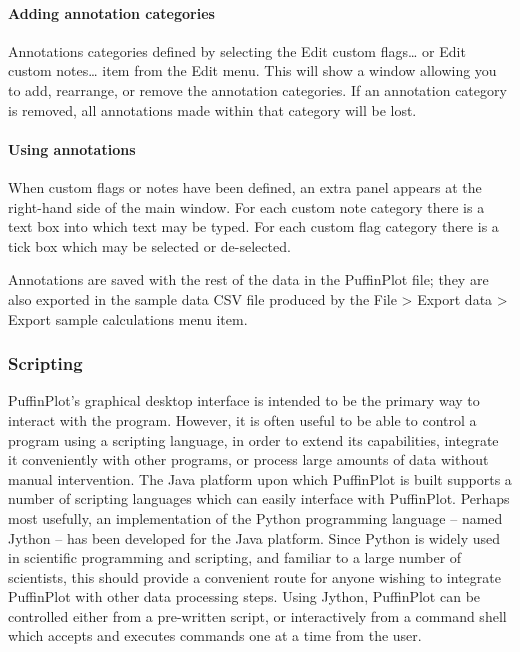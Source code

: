 \documentclass[a4paper,british]{article}
\newcommand{\ppcmd}[1]{\textsf{#1}} %
\newcommand{\caps}[1]{\MakeTextUppercase{#1}} %
\newcommand{\submenu}{ \textgreater{} } %
\begin{document}
\paragraph{Adding annotation categories}

Annotations categories defined by selecting the \ppcmd{Edit custom
  flags\ldots} or \ppcmd{Edit custom notes\ldots} item from the \ppcmd{Edit}
menu. This will show a window allowing you to add, rearrange, or remove the
annotation categories. If an annotation category is removed, all annotations
made within that category will be lost.

\paragraph{Using annotations}

When custom flags or notes have been defined, an extra panel appears at the
right-hand side of the main window. For each custom note category there is a
text box into which text may be typed. For each custom flag category there is
a tick box which may be selected or de-selected.

Annotations are saved with the rest of the data in the PuffinPlot file; they
are also exported in the sample data \caps{csv} file produced by the
\ppcmd{File\submenu Export data\submenu Export sample calculations} menu
item.

\subsubsection{\label{sec:scripting}Scripting}

PuffinPlot's graphical desktop interface is intended to be the primary way to
interact with the program. However, it is often useful to be able to control
a program using a scripting language, in order to extend its capabilities,
integrate it conveniently with other programs, or process large amounts of
data without manual intervention. The Java platform upon which PuffinPlot is
built supports a number of scripting languages which can easily interface
with PuffinPlot. Perhaps most usefully, an implementation of the Python
programming language -- named Jython \citep{juneau2009jython} -- has been
developed for the Java platform. Since Python is widely used in scientific
programming and scripting, and familiar to a large number of scientists, this
should provide a convenient route for anyone wishing to integrate PuffinPlot
with other data processing steps. Using Jython, PuffinPlot can be controlled
either from a pre-written script, or interactively from a command shell which
accepts and executes commands one at a time from the user.
\end{document}
